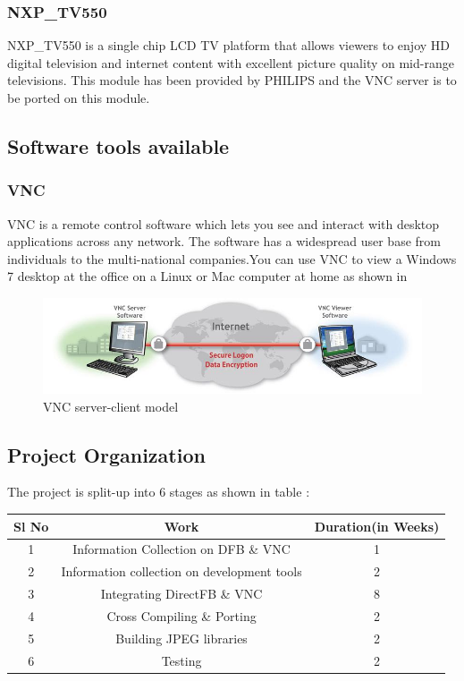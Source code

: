 \subsubsection{NXP\_TV550}
	NXP\_TV550 is a single chip LCD TV platform that allows viewers to enjoy HD digital television and internet content with excellent picture quality on mid-range televisions. This module has been provided by PHILIPS and the VNC server is to be ported on this module.\\


\subsection{Software tools available}
\subsubsection{VNC}
	VNC is a remote control software which lets you see and interact with desktop applications across any network. The software has a widespread user base from individuals to the multi-national companies.You can use VNC to view a Windows 7 desktop at the office on a Linux or Mac computer at home as shown in  \cite{VNC}\\

\begin{figure}[h]
\includegraphics[scale=.5]{images/vnc.jpg}
\caption{VNC server-client model}\label{fig:vnc}
\end{figure}


\subsection{Project Organization}
	The project is split-up into 6 stages as shown in table :\\
	
\begin{tabular}{|c|c|c|}\hline
Sl No&Work& Duration(in Weeks)\\ \hline \normalsize
1&Information Collection on DFB \& VNC&1 \\ \hline
2&Information collection on development tools&2\\ \hline
3&Integrating DirectFB \& VNC&8\\ \hline
4&Cross Compiling \& Porting&2\\ \hline
5&Building JPEG libraries&2\\ \hline
6&Testing&2\\ \hline
\end{tabular}

